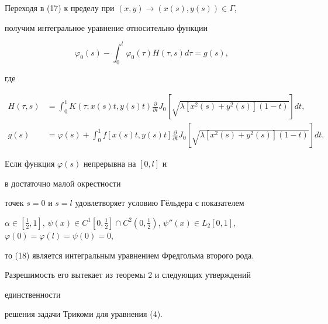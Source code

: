 Переходя в (17) к пределу при $(x,y)\to (x(s),y(s))\in \Gamma$,


получим интегральное уравнение относительно функции


\begin{equation}


\varphi_0(s)-\int_0^l\varphi_0(\tau )H(\tau ,s)d\tau= g(s),


\end{equation}


где


\begin{align*}


H(\tau ,s)&=\int_0^1 K(\tau ;x(s)t,y(s)t)\frac {\partial }


{\partial t}J_0[\sqrt {\lambda [x^2(s)+y^2(s)](1-t)}]dt,\\


%


g(s)&=\varphi (s)+\int_0^1 f[x(s)t,y(s)t]\frac {\partial }


{\partial t}J_0[\sqrt {\lambda [x^2(s)+y^2(s)](1-t)}]dt.


\end{align*}





Если функция $\varphi (s)$ непрерывна на $[0,l]$ и


в достаточно малой окрестности


точек $s=0$ и $s=l$ удовлетворяет условию Г\"ельдера с показателем


$\alpha \in [\frac {1}{2},1]$, $\psi (x)\in C^1[0,\frac {1}{2}]


\cap C^2(0,\frac {1}{2})$, $\psi ''(x)\in L_2[0,1]$, $\varphi (0)=


\varphi (l)=\psi (0)=0$,


то (18) является интегральным уравнением Фредгольма второго рода.


Разрешимость его вытекает из теоремы 2 и следующих утверждений 


единственности


решения задачи Трикоми для уравнения (4).





